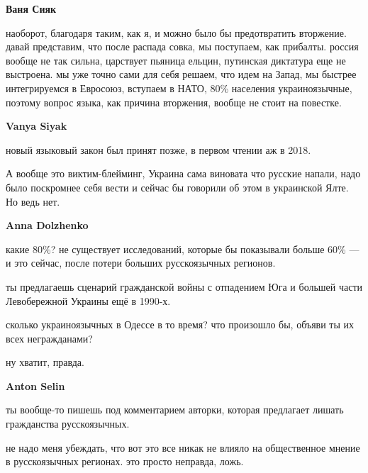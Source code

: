 \begin{itemize}
\begin{itemize}
\textbf{Ваня Сияк} 

наоборот, благодаря таким, как я, и можно было бы предотвратить вторжение.
давай представим, что после распада совка, мы поступаем, как прибалты. россия
вообще не так сильна, царствует пьяница ельцин, путинская диктатура еще не
выстроена. мы уже точно сами для себя решаем, что идем на Запад, мы быстрее
интегрируемся в Евросоюз, вступаем в НАТО, 80\% населения украиноязычные,
поэтому вопрос языка, как причина вторжения, вообще не стоит на повестке.

 
\textbf{Vanya Siyak} 

новый языковый закон был принят позже, в первом чтении аж в 2018.

А вообще это виктим-блейминг, Украина сама виновата что русские напали, надо
было поскромнее себя вести и сейчас бы говорили об этом в украинской Ялте. Но
ведь нет.


 
\textbf{Anna Dolzhenko} 

какие 80\%? не существует исследований, которые бы показывали больше 60\% — и
это сейчас, после потери больших русскоязычных регионов.

ты предлагаешь сценарий гражданской войны с отпадением Юга и большей части
Левобережной Украины ещё в 1990-х.

сколько украиноязычных в Одессе в то время? что произошло бы, объяви ты их всех
негражданами?

ну хватит, правда.

 
\textbf{Anton Selin} 

ты вообще-то пишешь под комментарием авторки, которая предлагает лишать
гражданства русскоязычных.

не надо меня убеждать, что вот это все никак не влияло на общественное мнение в
русскоязычных регионах. это просто неправда, ложь.


\end{itemize}
\end{itemize}
